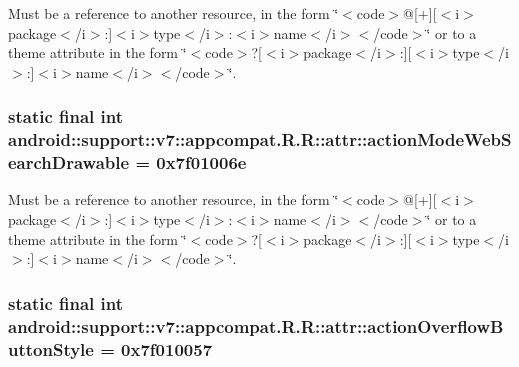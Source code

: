 Must be a reference to another resource, in the form \char`\"{}$<$code$>$@\mbox{[}+\mbox{]}\mbox{[}$<$i$>$package$<$/i$>$:\mbox{]}$<$i$>$type$<$/i$>$:$<$i$>$name$<$/i$>$$<$/code$>$\char`\"{} or to a theme attribute in the form \char`\"{}$<$code$>$?\mbox{[}$<$i$>$package$<$/i$>$:\mbox{]}\mbox{[}$<$i$>$type$<$/i$>$:\mbox{]}$<$i$>$name$<$/i$>$$<$/code$>$\char`\"{}. \hypertarget{classandroid_1_1support_1_1v7_1_1appcompat_1_1_r_1_1attr_753dbd4ddfbb2a5d9c75c4f48d0367fd}{
\subsubsection[{actionModeWebSearchDrawable}]{\setlength{\rightskip}{0pt plus 5cm}static final int android::support::v7::appcompat.R.R::attr::actionModeWebSearchDrawable = 0x7f01006e}}
\label{classandroid_1_1support_1_1v7_1_1appcompat_1_1_r_1_1attr_753dbd4ddfbb2a5d9c75c4f48d0367fd}


Must be a reference to another resource, in the form \char`\"{}$<$code$>$@\mbox{[}+\mbox{]}\mbox{[}$<$i$>$package$<$/i$>$:\mbox{]}$<$i$>$type$<$/i$>$:$<$i$>$name$<$/i$>$$<$/code$>$\char`\"{} or to a theme attribute in the form \char`\"{}$<$code$>$?\mbox{[}$<$i$>$package$<$/i$>$:\mbox{]}\mbox{[}$<$i$>$type$<$/i$>$:\mbox{]}$<$i$>$name$<$/i$>$$<$/code$>$\char`\"{}. \hypertarget{classandroid_1_1support_1_1v7_1_1appcompat_1_1_r_1_1attr_c90f81a5c9f5edd8ea34f6c38951d443}{
\subsubsection[{actionOverflowButtonStyle}]{\setlength{\rightskip}{0pt plus 5cm}static final int android::support::v7::appcompat.R.R::attr::actionOverflowButtonStyle = 0x7f010057}}
\label{classandroid_1_1support_1_1v7_1_1appcompat_1_1_r_1_1attr_c90f81a5c9f5edd8ea34f6c38951d443}



